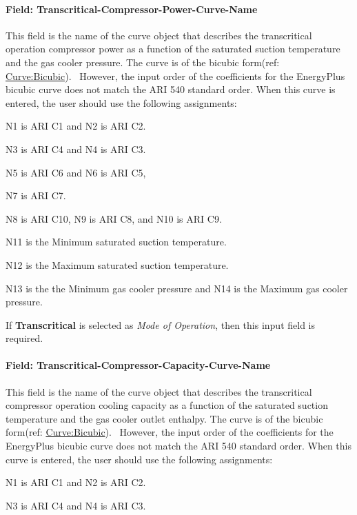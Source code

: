 \paragraph{Field: Transcritical-Compressor-Power-Curve-Name}\label{field-transcritical-compressor-power-curve-name}

This field is the name of the curve object that describes the transcritical operation compressor power as a function of the saturated suction temperature and the gas cooler pressure. The curve is of the bicubic form(ref: \hyperref[curvebicubic]{Curve:Bicubic}).~ However, the input order of the coefficients for the EnergyPlus bicubic curve does not match the ARI 540 standard order. When this curve is entered, the user should use the following assignments:

N1 is ARI C1 and N2 is ARI C2.

N3 is ARI C4 and N4 is ARI C3.

N5 is ARI C6 and N6 is ARI C5,

N7 is ARI C7.

N8 is ARI C10, N9 is ARI C8, and N10 is ARI C9.

N11 is the Minimum saturated suction temperature.

N12 is the Maximum saturated suction temperature.

N13 is the the Minimum gas cooler pressure and N14 is the Maximum gas cooler pressure.

If \textbf{Transcritical} is selected as \textit{Mode of Operation}, then this input field is required.

\paragraph{Field: Transcritical-Compressor-Capacity-Curve-Name}\label{field-transcritical-compressor-capacity-curve-name}

This field is the name of the curve object that describes the transcritical compressor operation cooling capacity as a function of the saturated suction temperature and the gas cooler outlet enthalpy. The curve is of the bicubic form(ref: \hyperref[curvebicubic]{Curve:Bicubic}).~ However, the input order of the coefficients for the EnergyPlus bicubic curve does not match the ARI 540 standard order. When this curve is entered, the user should use the following assignments:

N1 is ARI C1 and N2 is ARI C2.

N3 is ARI C4 and N4 is ARI C3.

